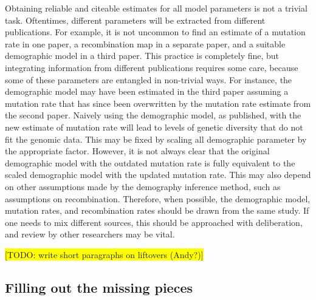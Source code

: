 \documentclass[hidelinks]{article}
\begin{document}
Obtaining reliable and citeable estimates for all model parameters is not a trivial task. Oftentimes, different parameters will be extracted from different publications. For example, it is not uncommon to find an estimate of a mutation rate in one paper, a recombination map in a separate paper, and a suitable demographic model in a third paper. This practice is completely fine, but integrating information from different publications requires some care, because some of these parameters are entangled in non-trivial ways.
For instance, the demographic model may have been estimated in the third paper assuming a mutation rate that has since been overwritten by the mutation rate estimate from the second paper. Naively using the demographic model, as published, with the new estimate of mutation rate will lead to levels of genetic diversity that do not fit the genomic data. This may be fixed by scaling all demographic parameter by the appropriate factor.
However, it is not always clear that the original demographic model with the outdated mutation rate is fully equivalent to the scaled demographic model with the updated mutation rate. This may also depend on other assumptions made by the demography inference method, such as assumptions on recombination. Therefore, when possible, the demographic model, mutation rates, and recombination rates should
be drawn from the same study. If one needs to mix different sources, this should be approached with deliberation, and review by other researchers may be vital.


\colorbox{yellow}{[TODO: write short paragraphs on liftovers (Andy?)]}

\subsection*{Filling out the missing pieces}
\end{document}
